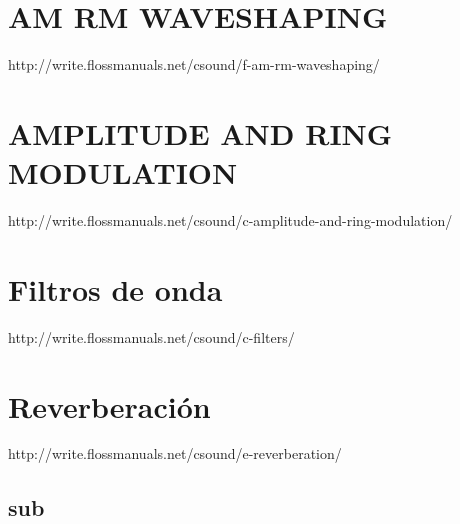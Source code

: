 \section{AM RM WAVESHAPING}
http://write.flossmanuals.net/csound/f-am-rm-waveshaping/
\section{AMPLITUDE AND RING MODULATION}
http://write.flossmanuals.net/csound/c-amplitude-and-ring-modulation/
\section{Filtros de onda}
http://write.flossmanuals.net/csound/c-filters/
\section{Reverberación}
http://write.flossmanuals.net/csound/e-reverberation/

\subsection{sub}


 

